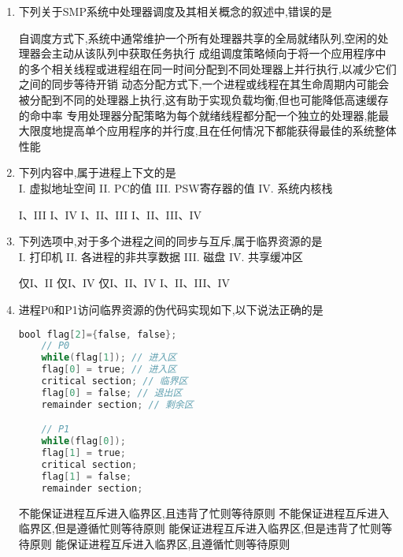 \documentclass[12pt, a4paper, oneside, UTF8]{ctexbook}
\begin{document}
\begin{enumerate}
    \item 下列关于SMP系统中处理器调度及其相关概念的叙述中,错误的是
    \begin{choices}[1]
    \task 自调度方式下,系统中通常维护一个所有处理器共享的全局就绪队列,空闲的处理器会主动从该队列中获取任务执行
    \task 成组调度策略倾向于将一个应用程序中的多个相关线程或进程组在同一时间分配到不同处理器上并行执行,以减少它们之间的同步等待开销
    \task 动态分配方式下,一个进程或线程在其生命周期内可能会被分配到不同的处理器上执行,这有助于实现负载均衡,但也可能降低高速缓存的命中率
    \task 专用处理器分配策略为每个就绪线程都分配一个独立的处理器,能最大限度地提高单个应用程序的并行度,且在任何情况下都能获得最佳的系统整体性能
    \end{choices}

    \item 下列内容中,属于进程上下文的是\\
    I. 虚拟地址空间\quad
    II. PC的值\quad
    III. PSW寄存器的值\quad
    IV. 系统内核栈
    \begin{choices}[2]
    \task I、III
    \task I、IV
    \task I、II、III
    \task I、II、III、IV
    \end{choices}

    \item 下列选项中,对于多个进程之间的同步与互斥,属于临界资源的是\\
    I. 打印机\quad
    II. 各进程的非共享数据\quad
    III. 磁盘\quad
    IV. 共享缓冲区
    \begin{choices}[2]
    \task 仅I、II
    \task 仅I、IV
    \task 仅I、II、IV
    \task I、II、III、IV
    \end{choices}

    \item 进程P0和P1访问临界资源的伪代码实现如下,以下说法正确的是
    \begin{lstlisting}[language=C]
    bool flag[2]={false, false};
    // P0               
    while(flag[1]); // 进入区
    flag[0] = true; // 进入区
    critical section; // 临界区
    flag[0] = false; // 退出区
    remainder section; // 剩余区

    // P1 
    while(flag[0]);
    flag[1] = true;
    critical section;
    flag[1] = false;
    remainder section;
    \end{lstlisting}
    \begin{choices}[1]
    \task 不能保证进程互斥进入临界区,且违背了忙则等待原则
    \task 不能保证进程互斥进入临界区,但是遵循忙则等待原则
    \task 能保证进程互斥进入临界区,但是违背了忙则等待原则
    \task 能保证进程互斥进入临界区,且遵循忙则等待原则
    \end{choices}


\end{enumerate}
\end{document}
